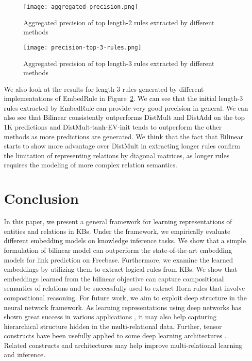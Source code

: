 \documentclass{article} \usepackage{iclr2015,times}
\begin{document}
\begin{figure}[ht]
\centering
\texttt{[image: aggregated\_precision.png]}
\caption{Aggregated precision of top length-2 rules extracted by different methods}
\label{fig:aggregate-precision}
\end{figure}

\begin{figure}[ht]
\centering
\texttt{[image: precision-top-3-rules.png]}
\caption{Aggregated precision of top length-3 rules extracted by different methods}
\label{fig:precision-len-3}
\end{figure}
We also look at the results for length-3 rules generated by different implementations of {\sc EmbedRule} in Figure~\ref{fig:precision-len-3}. We can see that the initial length-3 rules extracted by {\sc EmbedRule} can provide very good precision in general. We can also see that {\sc Bilinear} consistently outperforms {\sc DistMult} and {\sc DistAdd} on the top 1K predictions and {\sc DistMult-tanh-EV-init} tends to outperform the other methods as more predictions are generated. We think that the fact that {\sc Bilinear} starts to show more advantage over {\sc DistMult} in extracting longer rules confirm the limitation of representing relations by diagonal matrices, as longer rules requires the modeling of more complex relation semantics.

\section{Conclusion}
\label{sec:conclusion}
In this paper, we present a general framework for learning representations of entities and relations in KBs. Under the framework, we empirically evaluate different embedding models on knowledge inference tasks. We show that a simple formulation of bilinear model can outperform the state-of-the-art embedding models for link prediction on Freebase. Furthermore, we examine the learned embeddings by utilizing them to extract logical rules from KBs. We show that embeddings learned from the bilinear objective can capture compositional semantics of relations and be successfully used to extract Horn rules that involve compositional reasoning. For future work, we aim to exploit deep structure in the neural network framework. As learning representations using deep networks has shown great success in various applications \citep{Hinton2012,Vinyals12,deng2013new}, it may also help capturing hierarchical structure hidden in the multi-relational data. Further, tensor constructs have been usefully applied to some deep learning architectures \citep{Yu2013,HutchinsonPAMI}. Related constructs and architectures may help improve multi-relational learning and inference. 
\end{document}

